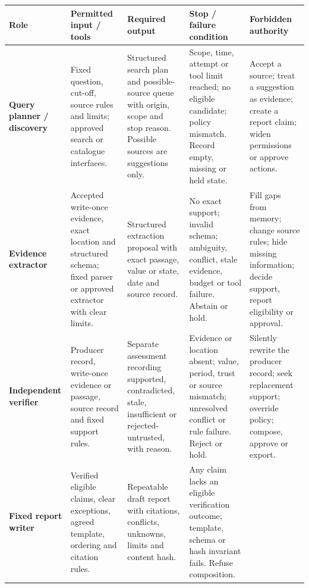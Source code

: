 \clearpage
\begin{table}[p]
  \centering
  \footnotesize
  \setlength{\tabcolsep}{2.1pt}
  \renewcommand{\arraystretch}{1.16}
  \begin{tabularx}{\textwidth}{@{}P{0.145\textwidth}P{0.185\textwidth}P{0.19\textwidth}Y P{0.19\textwidth}@{}}
    \toprule
    \textbf{Role} &
    \textbf{Permitted input / tools} &
    \textbf{Required output} &
    \textbf{Stop / failure condition} &
    \textbf{Forbidden authority} \\
    \midrule
    \textbf{Query planner / discovery} &
    Fixed question, cut-off, source rules and limits; approved search or catalogue interfaces. &
    Structured search plan and possible-source queue with origin, scope and stop reason. Possible sources are suggestions only. &
    Scope, time, attempt or tool limit reached; no eligible candidate; policy mismatch. Record empty, missing or held state. &
    Accept a source; treat a suggestion as evidence; create a report claim; widen permissions or approve actions. \\
    \addlinespace
    \textbf{Evidence extractor} &
    Accepted write-once evidence, exact location and structured schema; fixed parser or approved extractor with clear limits. &
    Structured extraction proposal with exact passage, value or state, date and source record. &
    No exact support; invalid schema; ambiguity, conflict, stale evidence, budget or tool failure. Abstain or hold. &
    Fill gaps from memory; change source rules; hide missing information; decide support, report eligibility or approval. \\
    \addlinespace
    \textbf{Independent verifier} &
    Producer record, write-once evidence or passage, source record and fixed support rules. &
    Separate assessment recording supported, contradicted, stale, insufficient or rejected-untrusted, with reason. &
    Evidence or location absent; value, period, trust or source mismatch; unresolved conflict or rule failure. Reject or hold. &
    Silently rewrite the producer record; seek replacement support; override policy; compose, approve or export. \\
    \addlinespace
    \textbf{Fixed report writer} &
    Verified eligible claims, clear exceptions, agreed template, ordering and citation rules. &
    Repeatable draft report with citations, conflicts, unknowns, limits and content hash. &
    Any claim lacks an eligible verification outcome; template, schema or hash invariant fails. Refuse composition. &

\end{tabularx}
\end{table}
